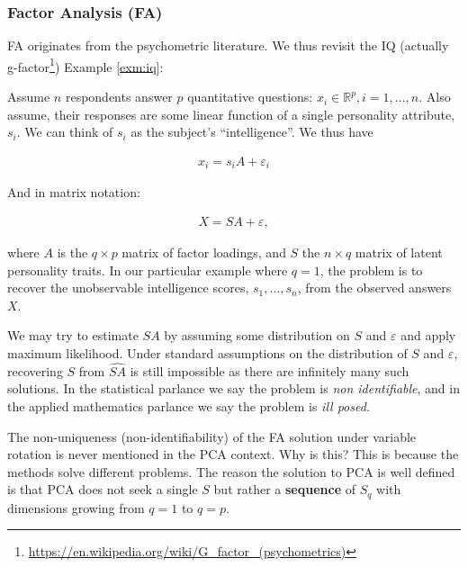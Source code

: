 \documentclass[]{book}
\theoremstyle{definition}
\theoremstyle{definition}
\theoremstyle{definition}
\theoremstyle{remark}
\let\BeginKnitrBlock\begin \let\EndKnitrBlock\end
\begin{document}
\subsubsection{Factor Analysis (FA)}\label{factor-analysis-fa}

FA originates from the psychometric literature. We thus revisit the IQ
(actually g-factor\footnote{\url{https://en.wikipedia.org/wiki/G_factor_(psychometrics)}})
Example \ref{exm:iq}:

\BeginKnitrBlock{example}
\protect\hypertarget{exm:unnamed-chunk-197}{}{\label{exm:unnamed-chunk-197}
}Assume \(n\) respondents answer \(p\) quantitative questions:
\(x_i \in \mathbb{R}^p, i=1,\dots,n\). Also assume, their responses are
some linear function of a single personality attribute, \(s_i\). We can
think of \(s_i\) as the subject's ``intelligence''. We thus have

\begin{align}
    x_i = s_i A  + \varepsilon_i
\end{align}

And in matrix notation:

\begin{align}
    X = S A+\varepsilon,
    \label{eq:factor}
\end{align}

where \(A\) is the \(q \times p\) matrix of factor loadings, and \(S\)
the \(n \times q\) matrix of latent personality traits. In our
particular example where \(q=1\), the problem is to recover the
unobservable intelligence scores, \(s_1,\dots,s_n\), from the observed
answers \(X\).
\EndKnitrBlock{example}

We may try to estimate \(S A\) by assuming some distribution on \(S\)
and \(\varepsilon\) and apply maximum likelihood. Under standard
assumptions on the distribution of \(S\) and \(\varepsilon\), recovering
\(S\) from \(\widehat{S A }\) is still impossible as there are
infinitely many such solutions. In the statistical parlance we say the
problem is \emph{non identifiable}, and in the applied mathematics
parlance we say the problem is \emph{ill posed}.

\BeginKnitrBlock{remark}
{}The non-uniqueness (non-identifiability) of
the FA solution under variable rotation is never mentioned in the PCA
context. Why is this? This is because the methods solve different
problems. The reason the solution to PCA is well defined is that PCA
does not seek a single \(S\) but rather a \textbf{sequence} of \(S_q\)
with dimensions growing from \(q=1\) to \(q=p\).
\EndKnitrBlock{remark}
\end{document}
